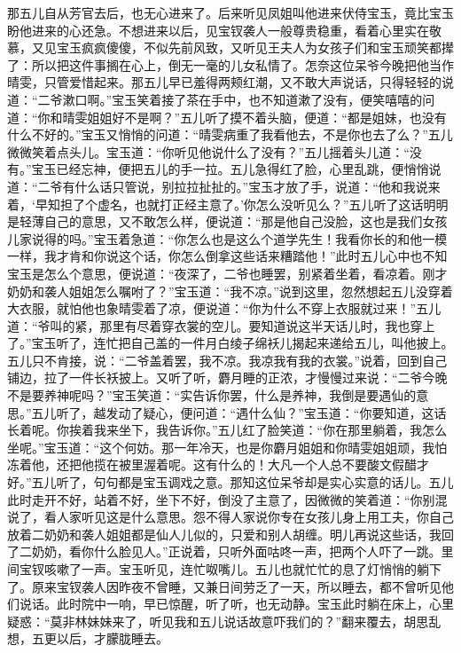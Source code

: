 \begin{parag}
    那五儿自从芳官去后，也无心进来了。后来听见凤姐叫他进来伏侍宝玉，竟比宝玉盼他进来的心还急。不想进来以后，见宝钗袭人一般尊贵稳重，看着心里实在敬慕，又见宝玉疯疯傻傻，不似先前风致，又听见王夫人为女孩子们和宝玉顽笑都撵了：所以把这件事搁在心上，倒无一毫的儿女私情了。怎奈这位呆爷今晚把他当作晴雯，只管爱惜起来。那五儿早已羞得两颊红潮，又不敢大声说话，只得轻轻的说道：“二爷漱口啊。”宝玉笑着接了茶在手中，也不知道漱了没有，便笑嘻嘻的问道：“你和晴雯姐姐好不是啊？”五儿听了摸不着头脑，便道：“都是姐妹，也没有什么不好的。”宝玉又悄悄的问道：“晴雯病重了我看他去，不是你也去了么？”五儿微微笑着点头儿。宝玉道：“你听见他说什么了没有？”五儿摇着头儿道：“没有。”宝玉已经忘神，便把五儿的手一拉。五儿急得红了脸，心里乱跳，便悄悄说道：“二爷有什么话只管说，别拉拉扯扯的。”宝玉才放了手，说道：“他和我说来着，‘早知担了个虚名，也就打正经主意了。’你怎么没听见么？”五儿听了这话明明是轻薄自己的意思，又不敢怎么样，便说道：“那是他自己没脸，这也是我们女孩儿家说得的吗。”宝玉着急道：“你怎么也是这么个道学先生！我看你长的和他一模一样，我才肯和你说这个话，你怎么倒拿这些话来糟踏他！”此时五儿心中也不知宝玉是怎么个意思，便说道：“夜深了，二爷也睡罢，别紧着坐着，看凉着。刚才奶奶和袭人姐姐怎么嘱咐了？”宝玉道：“我不凉。”说到这里，忽然想起五儿没穿着大衣服，就怕他也象晴雯着了凉，便说道：“你为什么不穿上衣服就过来！”五儿道：“爷叫的紧，那里有尽着穿衣裳的空儿。要知道说这半天话儿时，我也穿上了。”宝玉听了，连忙把自己盖的一件月白绫子绵袄儿揭起来递给五儿，叫他披上。五儿只不肯接，说：“二爷盖着罢，我不凉。我凉我有我的衣裳。”说着，回到自己铺边，拉了一件长袄披上。又听了听，麝月睡的正浓，才慢慢过来说：“二爷今晚不是要养神呢吗？”宝玉笑道：“实告诉你罢，什么是养神，我倒是要遇仙的意思。”五儿听了，越发动了疑心，便问道：“遇什么仙？”宝玉道：“你要知道，这话长着呢。你挨着我来坐下，我告诉你。”五儿红了脸笑道：“你在那里躺着，我怎么坐呢。”宝玉道：“这个何妨。那一年冷天，也是你麝月姐姐和你晴雯姐姐顽，我怕冻着他，还把他揽在被里渥着呢。这有什么的！大凡一个人总不要酸文假醋才好。”五儿听了，句句都是宝玉调戏之意。那知这位呆爷却是实心实意的话儿。五儿此时走开不好，站着不好，坐下不好，倒没了主意了，因微微的笑着道：“你别混说了，看人家听见这是什么意思。怨不得人家说你专在女孩儿身上用工夫，你自己放着二奶奶和袭人姐姐都是仙人儿似的，只爱和别人胡缠。明儿再说这些话，我回了二奶奶，看你什么脸见人。”正说着，只听外面咕咚一声，把两个人吓了一跳。里间宝钗咳嗽了一声。宝玉听见，连忙呶嘴儿。五儿也就忙忙的息了灯悄悄的躺下了。原来宝钗袭人因昨夜不曾睡，又兼日间劳乏了一天，所以睡去，都不曾听见他们说话。此时院中一响，早已惊醒，听了听，也无动静。宝玉此时躺在床上，心里疑惑：“莫非林妹妹来了，听见我和五儿说话故意吓我们的？”翻来覆去，胡思乱想，五更以后，才朦胧睡去。
\end{parag}


